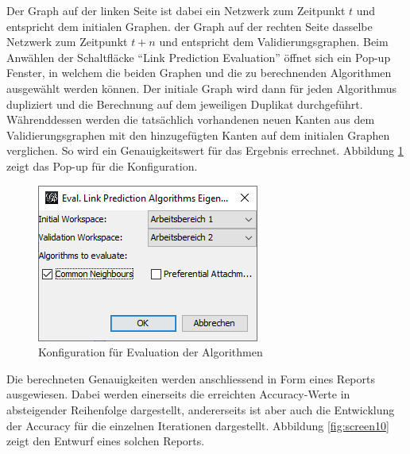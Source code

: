 Der Graph auf der linken Seite ist dabei ein Netzwerk zum Zeitpunkt $t$ und entspricht dem initialen Graphen. der Graph auf der rechten Seite
dasselbe Netzwerk zum Zeitpunkt $t + n$ und entspricht dem Validierungsgraphen. Beim Anwählen der Schaltfläcke ``Link Prediction Evaluation'' öffnet sich ein Pop-up Fenster, in
welchem die beiden Graphen und die zu berechnenden Algorithmen ausgewählt werden können. Der initiale Graph wird dann für jeden
Algorithmus dupliziert und die Berechnung auf dem jeweiligen Duplikat durchgeführt. Währenddessen werden die tatsächlich
vorhandenen neuen Kanten aus dem Validierungsgraphen mit den hinzugefügten Kanten auf dem initialen Graphen verglichen. So wird ein Genauigkeitswert für
das Ergebnis errechnet. Abbildung \ref{fig:screen9} zeigt das Pop-up für die Konfiguration.

\begin{figure}
    \centering
    \includegraphics[width=0.5\linewidth]{resources/sc7.png}
    \caption{Konfiguration für Evaluation der Algorithmen}
    \label{fig:screen9}
\end{figure}

Die berechneten Genauigkeiten werden anschliessend in Form eines Reports ausgewiesen.
Dabei werden einerseits die erreichten Accuracy-Werte in absteigender Reihenfolge dargestellt, andererseits ist aber auch die Entwicklung der Accuracy für die einzelnen Iterationen dargestellt.
Abbildung \ref{fig:screen10} zeigt den Entwurf eines solchen Reports.

